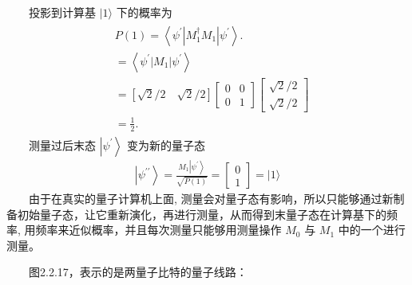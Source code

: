 \documentclass[a4paper,11pt,english]{sphinxmanual}
\begin{document}
\sphinxAtStartPar
  投影到计算基 \(|1\rangle\) 下的概率为
\begin{equation*}
\begin{split}\begin{aligned} & P(1)=\left\langle\psi^{\prime}\left|M_{1}^{\dagger} M_{1}\right| \psi^{\prime}\right\rangle. \\ &=\left\langle\psi^{\prime}\left|M_{1}\right| \psi^{\prime}\right\rangle \\ &=[\sqrt{2} / 2 \quad \sqrt{2} / 2]\left[\begin{array}{ll} 0 & 0 \\ 0 & 1 \end{array}\right]\left[\begin{array}{c} \sqrt{2} / 2 \\ \sqrt{2} / 2 \end{array}\right] \\ &=\frac{1}{2} . \end{aligned}\end{split}
\end{equation*}
\sphinxAtStartPar
  测量过后末态 \(\left|\psi^{\prime}\right\rangle\) 变为新的量子态
\begin{equation*}
\begin{split}\left|\psi^{\prime \prime}\right\rangle=\frac{M_{1}\left|\psi^{\prime}\right\rangle}{\sqrt{P(1)}}=\left[\begin{array}{l} 0 \\ 1 \end{array}\right]=|1\rangle\end{split}
\end{equation*}
\sphinxAtStartPar
  由于在真实的量子计算机上面, 测量会对量子态有影响，所以只能够通过新制备初始量子态，让它重新演化，再进行测量，从而得到末量子态在计算基下的频率, 用频率来近似概率，并且每次测量只能够用测量操作  \(M_{0}\) 与   \(M_{1}\) 中的一个进行测量。

\sphinxAtStartPar
​  图2.2.17，表示的是两量子比特的量子线路：

\end{document}
